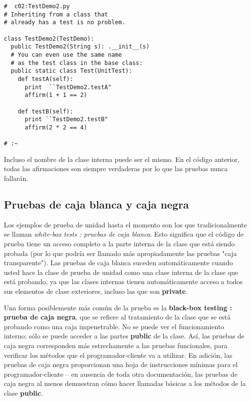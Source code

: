 \begin{lstlisting}
#  c02:TestDemo2.py 
# Inheriting from a class that  
# already has a test is no problem. 

class TestDemo2(TestDemo): 
  public TestDemo2(String s): .__init__(s)  
  # You can even use the same name  
  # as the test class in the base class: 
  public static class Test(UnitTest): 
    def testA(self): 
      print  ``TestDemo2.testA"
      affirm(1 + 1 == 2) 
      
    def testB(self): 
      print ``TestDemo2.testB" 
      affirm(2 * 2 == 4) 
      
# :~ 
\end{lstlisting}

Incluso el nombre de la clase interna puede ser el mismo. En el código anterior, todas las afirmaciones son siempre verdaderas por lo que las pruebas nunca fallarán.

\subsection*{Pruebas de caja blanca y caja negra}
\label{subsec:pdcbycn}

Los ejemplos de prueba de unidad hasta el momento son los que tradicionalmente se llaman \textit{white-box tests : pruebas de caja blanca}. Esto significa que el código de prueba tiene un acceso completo a la parte interna de la clase que está siendo probada 
(por lo que podría ser llamado más apropiadamente las pruebas "caja transparente"). Las pruebas de caja blanca suceden automáticamente cuando usted 
hace la clase de prueba de unidad como una clase interna de la clase que está probando, ya que las clases internas tienen automáticamente acceso a todos sus elementos de clase exteriores, incluso las que son \textbf{private}.   \newline

Una forma posiblemente más común de la prueba es la \textbf{black-box testing :  prueba de caja negra}, que se refiere al tratamiento de la clase que se está probando como una caja impenetrable. No se puede ver el funcionamiento interno; sólo se puede acceder a las partes \textbf{public}  de la clase. Así, las pruebas de caja negra corresponden más estrechamente a las pruebas funcionales, para verificar los métodos que el programador-cliente va a utilizar. En adición, las pruebas de caja negra proporcionan una hoja de instrucciones mínimas para el programador-cliente  – en ausencia de toda otra documentación, las pruebas de caja negra al menos demuestran cómo hacer llamadas básicas a los métodos de la clase \textbf{public}.    \newline

